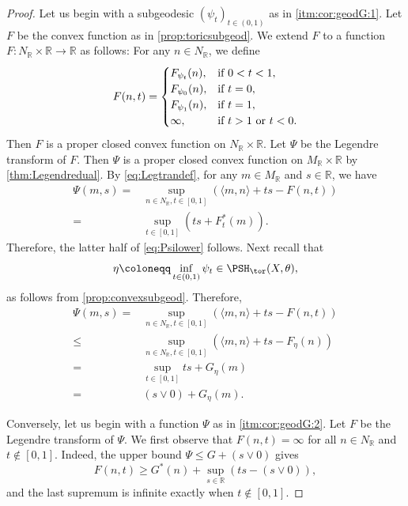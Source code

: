 \begin{proof}
    Let us begin with a subgeodesic $(\psi_t)_{t\in (0,1)}$ as in \ref{itm:cor:geodG:1}. Let $F$ be the convex function as in \cref{prop:toricsubgeod}.
    We extend $F$ to a function $F\colon N_{\mathbb{R}}\times \mathbb{R}\rightarrow \mathbb{R}$ as follows: For any $n\in N_{\mathbb{R}}$, we define
\[
F(n,t)=\begin{cases}
    F_{\psi_t}(n),&\textup{if }0<t<1,\\
    F_{\psi_0}(n),& \textup{if }t=0,\\
    F_{\psi_1}(n),&\textup{if }t=1,\\
    \infty,&\textup{if } t>1 \textup{ or }t<0.
\end{cases}
\]
Then $F$ is a proper closed convex function on $N_{\mathbb{R}}\times \mathbb{R}$. Let $\Psi$ be the Legendre transform of $F$. Then $\Psi$ is a proper closed convex function on $M_{\mathbb{R}}\times \mathbb{R}$ by \cref{thm:Legendredual}.
By \eqref{eq:Legtrandef}, for any $m\in M_{\mathbb{R}}$ and $s\in \mathbb{R}$, we have
\[
\begin{aligned}
\Psi(m,s)=&\sup_{n\in N_{\mathbb{R}},t\in [0,1]} \left( \langle m,n\rangle + ts-F(n,t)\right)\\
=& \sup_{t\in [0,1]} \left( ts+F_t^*(m) \right).
\end{aligned}
\]
Therefore, the latter half of \eqref{eq:Psilower} follows. Next recall that
\[
\eta\coloneqq \inf_{t\in (0,1)}\psi_t\in \PSH_{\tor}(X,\theta),
\]
as follows from \cref{prop:convexsubgeod}. Therefore,
\[
\begin{aligned}
\Psi(m,s)=&\sup_{n\in N_{\mathbb{R}},t\in [0,1]} \left( \langle m,n\rangle + ts-F(n,t)\right)\\
\leq & \sup_{n\in N_{\mathbb{R}},t\in [0,1]} \left( \langle m,n\rangle + ts-F_{\eta}(n)\right)\\
=& \sup_{t\in [0,1]}ts+G_{\eta}(m)\\
=& (s\lor 0)+G_{\eta}(m).
\end{aligned}
\]

Conversely, let us begin with a function $\Psi$ as in \ref{itm:cor:geodG:2}. Let $F$ be the Legendre transform of $\Psi$.
We first observe that $F(n,t)=\infty$ for all $n\in N_{\mathbb{R}}$ and $t\not\in [0,1]$.
Indeed, the upper bound $\Psi\leq G+(s\lor 0)$ gives
\[
F(n,t)\geq G^*(n)+\sup_{s\in\mathbb{R}}\left(ts-(s\lor 0)\right),
\]
and the last supremum is infinite exactly when $t\notin[0,1]$.


\end{proof}
